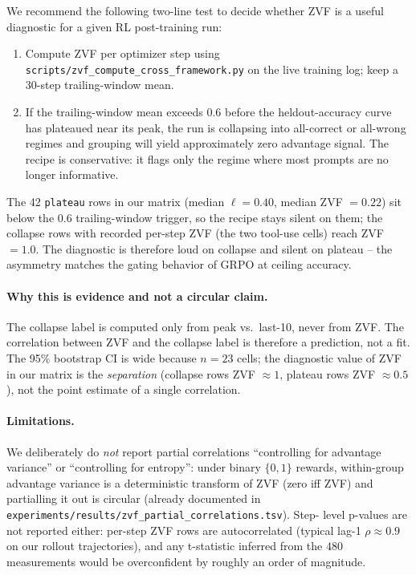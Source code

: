 We recommend the following two-line test to decide whether ZVF is
a useful diagnostic for a given RL post-training run:
\begin{enumerate}
\item Compute ZVF per optimizer step using
      \texttt{scripts/zvf\_compute\_cross\_framework.py} on the live
      training log; keep a $30$-step trailing-window mean.
\item If the trailing-window mean exceeds $0.6$ before the
      heldout-accuracy curve has plateaued near its peak, the run
      is collapsing into all-correct or all-wrong regimes and
      grouping will yield approximately zero advantage signal. The
      recipe is conservative: it flags only the regime where most
      prompts are no longer informative.
\end{enumerate}
The 42 \texttt{plateau} rows in our matrix (median
$\ell = 0.40$, median ZVF $= 0.22$) sit below the $0.6$
trailing-window trigger, so the recipe stays silent on them; the
collapse rows with recorded per-step ZVF (the two tool-use cells)
reach ZVF $= 1.0$. The diagnostic is therefore loud on collapse and
silent on plateau -- the asymmetry matches the gating behavior of GRPO
at ceiling accuracy.

\paragraph{Why this is evidence and not a circular claim.}
The collapse label is computed only from peak vs.\ last-10, never
from ZVF. The correlation between ZVF and the collapse label is
therefore a prediction, not a fit. The 95\% bootstrap CI is wide
because $n=23$ cells; the diagnostic value of ZVF in our matrix is
the \emph{separation} (collapse rows ZVF $\approx 1$, plateau rows
ZVF $\approx 0.5$), not the point estimate of a single correlation.

\paragraph{Limitations.}
We deliberately do \emph{not} report partial correlations
``controlling for advantage variance'' or ``controlling for
entropy'': under binary $\{0,1\}$ rewards, within-group advantage
variance is a deterministic transform of ZVF (zero iff ZVF) and
partialling it out is circular (already documented in
\texttt{experiments/results/zvf\_partial\_correlations.tsv}). Step-
level p-values are not reported either: per-step ZVF rows are
autocorrelated (typical lag-1 $\rho \approx 0.9$ on our rollout
trajectories), and any t-statistic inferred from the $480$
measurements would be overconfident by roughly an order of
magnitude.

